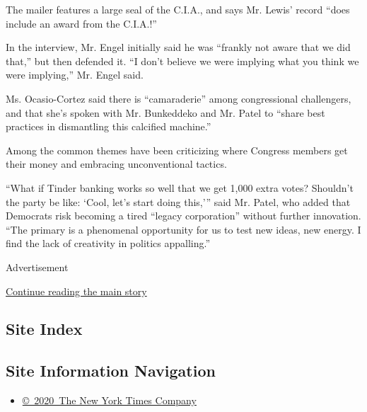 The mailer features a large seal of the C.I.A., and says Mr. Lewis'
record ``does include an award from the C.I.A.!''

In the interview, Mr. Engel initially said he was ``frankly not aware
that we did that,'' but then defended it. ``I don't believe we were
implying what you think we were implying,'' Mr. Engel said.

Ms. Ocasio-Cortez said there is ``camaraderie'' among congressional
challengers, and that she's spoken with Mr. Bunkeddeko and Mr. Patel to
``share best practices in dismantling this calcified machine.''

Among the common themes have been criticizing where Congress members get
their money and embracing unconventional tactics.

``What if Tinder banking works so well that we get 1,000 extra votes?
Shouldn't the party be like: `Cool, let's start doing this,''' said Mr.
Patel, who added that Democrats risk becoming a tired ``legacy
corporation'' without further innovation. ``The primary is a phenomenal
opportunity for us to test new ideas, new energy. I find the lack of
creativity in politics appalling.''

Advertisement

\protect\hyperlink{after-bottom}{Continue reading the main story}

\hypertarget{site-index}{%
\subsection{Site Index}\label{site-index}}

\hypertarget{site-information-navigation}{%
\subsection{Site Information
Navigation}\label{site-information-navigation}}

\begin{itemize}
\tightlist
\item
  \href{https://help.nytimes3xbfgragh.onion/hc/en-us/articles/115014792127-Copyright-notice}{©~2020~The
  New York Times Company}
\end{itemize}

